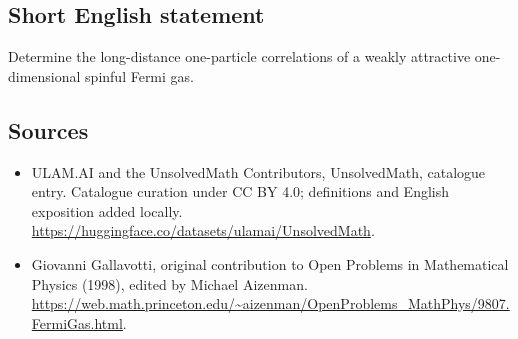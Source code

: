 \documentclass[11pt]{article}
\begin{document}
\subsection{Short English statement}
Determine the long-distance one-particle correlations of a weakly attractive one-dimensional spinful Fermi gas.
\subsection{Sources}
\begin{itemize}
\item[\hypertarget{source:statement:1}{S1}] ULAM.AI and the UnsolvedMath Contributors, UnsolvedMath, catalogue entry. Catalogue curation under CC BY 4.0; definitions and English exposition added locally.
\url{https://huggingface.co/datasets/ulamai/UnsolvedMath}.
\item[\hypertarget{source:statement:2}{S2}] Giovanni Gallavotti, original contribution to Open Problems in Mathematical Physics (1998), edited by Michael Aizenman.
\url{https://web.math.princeton.edu/~aizenman/OpenProblems_MathPhys/9807.FermiGas.html}.
\end{itemize}
\label{end:statement}
\end{document}
